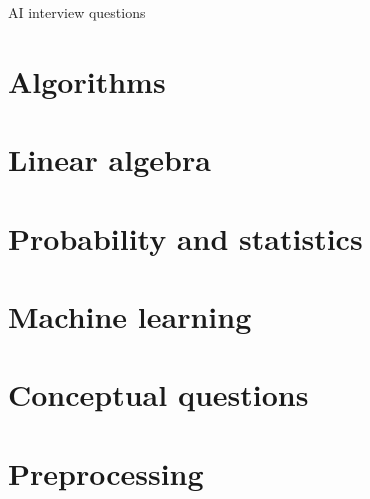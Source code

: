\documentclass{article}
\begin{document}
\begin{titlepage}
{{\Huge AI interview questions}}\end{titlepage}

\newpage
\section{Algorithms}


\newpage
\section{Linear algebra}


\newpage
\section{Probability and statistics}


\newpage
\section{Machine learning}


\newpage
\section{Conceptual questions}


\newpage
\section{Preprocessing}



	
\end{document}
